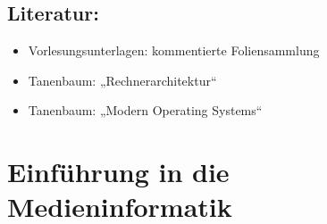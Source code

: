 \section*{Literatur:}\label{literatur-6}

\begin{itemize}
\item
  Vorlesungsunterlagen: kommentierte Foliensammlung
\item
  Tanenbaum: „Rechnerarchitektur``
\item
  Tanenbaum: „Modern Operating Systems``
\end{itemize}

\chapter{Einführung in die
Medieninformatik}\label{einfuxfchrung-in-die-medieninformatik}

